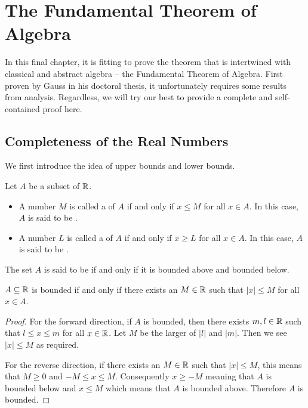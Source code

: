 \chapter{The Fundamental Theorem of Algebra}
In this final chapter, it is fitting to prove the theorem that is intertwined with classical and abstract algebra -- the Fundamental Theorem of Algebra. First proven by Gauss in his doctoral thesis, it unfortunately requires some results from analysis. Regardless, we will try our best to provide a complete and self-contained proof here.

\section{Completeness of the Real Numbers}
We first introduce the idea of upper bounds and lower bounds.

\begin{definition}
    Let $A$ be a subset of $\mathbb{R}$.
    \begin{itemize}
        \item A number $M$ is called a  of $A$ if and only if $x \leq M$ for all $x \in A$. In this case, $A$ is said to be .
        \item A number $L$ is called a  of $A$ if and only if $x \geq L$ for all $x \in A$. In this case, $A$ is said to be .
    \end{itemize}
    The set $A$ is said to be  if and only if it is bounded above and bounded below.
\end{definition}

\begin{proposition}
    $A \subseteq \mathbb{R}$ is bounded if and only if there exists an $M \in \mathbb{R}$ such that $|x| \leq M$ for all $x \in A$.
\end{proposition}
\begin{proof}
    For the forward direction, if $A$ is bounded, then there exists $m, l \in \mathbb{R}$ such that $l \leq x \leq m$ for all $x \in \mathbb{R}$. Let $M$ be the larger of $|l|$ and $|m|$. Then we see $|x| \leq M$ as required.

    For the reverse direction, if there exists an $M \in \mathbb{R}$ such that $|x| \leq M$, this means that $M \geq 0$ and $-M \leq x \leq M$. Consequently $x \geq -M$ meaning that $A$ is bounded below and $x \leq M$ which means that $A$ is bounded above. Therefore $A$ is bounded.
\end{proof}

